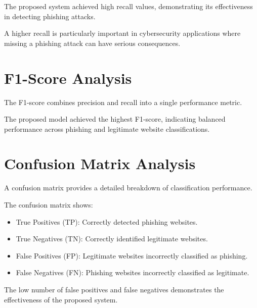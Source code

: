 \documentclass[12pt]{report}
\begin{document}
The proposed system achieved high recall values, demonstrating its effectiveness in detecting phishing attacks.

A higher recall is particularly important in cybersecurity applications where missing a phishing attack can have serious consequences.

\section{F1-Score Analysis}

The F1-score combines precision and recall into a single performance metric.


The proposed model achieved the highest F1-score, indicating balanced performance across phishing and legitimate website classifications.

\section{Confusion Matrix Analysis}

A confusion matrix provides a detailed breakdown of classification performance.


The confusion matrix shows:

\begin{itemize}
    \item True Positives (TP): Correctly detected phishing websites.
    \item True Negatives (TN): Correctly identified legitimate websites.
    \item False Positives (FP): Legitimate websites incorrectly classified as phishing.
    \item False Negatives (FN): Phishing websites incorrectly classified as legitimate.
\end{itemize}

The low number of false positives and false negatives demonstrates the effectiveness of the proposed system.
\end{document}
